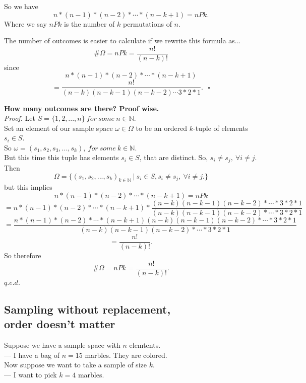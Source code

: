 \documentclass[12pt]{book}
\begin{document}
So we have $$n*(n-1)*(n-2)* \cdots *(n-k+1) = nPk.$$
Where we say $nPk$ is the number of $k$ permutations of $n$.

The number of outcomes is easier to calculate if we rewrite this formula as...
$$\#\Omega = nPk = \frac{n!}{(n-k)!}$$
since 
$$n*(n-1)*(n-2)* \cdots *(n-k+1)$$
$$ = \frac{n!}{(n-k)(n-k-1)(n-k-2)\cdots 3*2*1}.~~~\square$$

\noindent \textbf{How many outcomes are there? Proof wise.}\\
\textit{Proof. }
Let $S=\{1,2,...,n\}~for~some~n\in \mathbb{N}$.\\
Set an element of our sample space $\omega \in \Omega$ to be an ordered $k$-tuple of elements $s_i \in S$.\\
So $\omega = (s_1, s_2, s_3,..., s_k), ~for~some~k\in \mathbb{N}$.\\
But this time this tuple has elements $s_i\in S$,  that are distinct. So, $s_i \neq s_j, ~\forall i\neq j.$\\
Then \\
$$\Omega = \big\{ (s_1, s_2, ..., s_k)_{k\in \mathbb{N}} ~\big|~ s_i \in S, s_i \neq s_j, ~\forall i\neq j. \big\}$$
but this implies
$$n*(n-1)*(n-2)* \cdots *(n-k+1) = nPk$$
$$\textstyle =n*(n-1)*(n-2)* \cdots *(n-k+1)*\frac{(n-k)(n-k-1)(n-k-2) *\cdots *3*2*1}{(n-k)(n-k-1)(n-k-2) *\cdots *3*2*1}$$
$$\textstyle =\frac{n*(n-1)*(n-2)* \cdots *(n-k+1)(n-k)(n-k-1)(n-k-2) *\cdots *3*2*1}{(n-k)(n-k-1)(n-k-2) *\cdots *3*2*1}$$
$$=\frac{n!}{(n-k)!}.$$
So therefore
$$ \#\Omega = nPk = \frac{n!}{(n-k)!}.$$\hfill$q.e.d.$
\newpage



\subsection{Sampling without replacement, \\ order doesn't matter}
Suppose we have a sample space with $n$ elemtents. \\
--- I have a bag of $n=15$ marbles. They are colored.\\
Now suppose we want to take a sample of size $k$. \\
--- I want to pick $k=4$ marbles.\\
\end{document}
